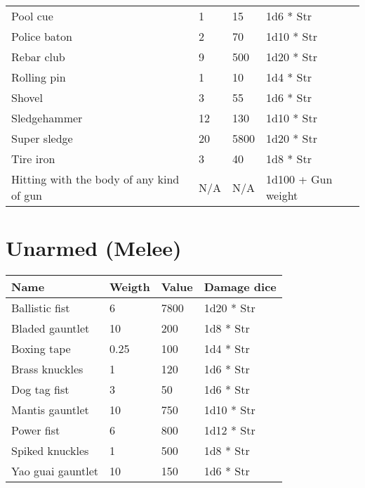 \documentclass{report}
\begin{document}
\begin{table}[H]
\begin{table}[H]
\begin{table}[H]
\begin{table}[H]
\begin{table}[H]
\begin{table}[H]
\begin{table}[H]
\begin{table}[H]
\begin{table}[H]
\begin{table}[H]
\begin{table}[H]
\begin{table}[H]
\begin{table}[H]
\begin{tabular}{p{30mm}p{30mm}p{30mm}p{30mm}}
Pool cue  & 1 & 15 & 1d6 * Str \\
Police baton  & 2 & 70 & 1d10 * Str \\
Rebar club  & 9 & 500 & 1d20 * Str \\
Rolling pin  & 1 & 10 & 1d4 * Str \\
Shovel  & 3 & 55 & 1d6 * Str \\
Sledgehammer  & 12 & 130 & 1d10 * Str \\
Super sledge  & 20 & 5800 & 1d20 * Str \\
Tire iron  & 3 & 40 & 1d8 * Str \\
Hitting with the body of any kind of gun & N/A & N/A & 1d100 + Gun weight  \\
  \end{tabular}
\chapter{Unarmed (Melee)}
\begin{table}[H]
  \centering
  \begin{tabular}{p{30mm}p{30mm}p{30mm}p{30mm}}
\bfseries Name & \bfseries Weigth & \bfseries Value & \bfseries Damage dice \\
\hline
Ballistic fist  & 6 & 7800 & 1d20 * Str \\
Bladed gauntlet  & 10 & 200 & 1d8  * Str \\
Boxing tape  & 0.25  & 100 & 1d4  * Str \\
Brass knuckles  & 1 & 120 & 1d6  * Str \\
Dog tag fist  & 3 & 50 & 1d6  * Str \\
Mantis gauntlet  & 10 & 750 & 1d10  * Str \\
Power fist & 6 & 800 & 1d12  * Str \\
Spiked knuckles  & 1 & 500 & 1d8  * Str \\
Yao guai gauntlet  & 10 & 150 & 1d6  * Str \\
  \end{tabular}

\end{table}
\end{table}
\end{table}
\end{table}
\end{table}
\end{table}
\end{table}
\end{table}
\end{table}
\end{table}
\end{table}
\end{table}
\end{table}
\end{table}
\end{document}

